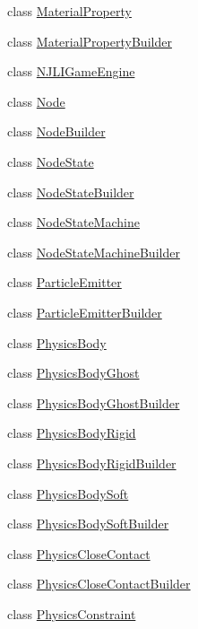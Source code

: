 \begin{DoxyCompactItemize}
class \mbox{\hyperlink{classnjli_1_1_material_property}{Material\+Property}}
\item 
class \mbox{\hyperlink{classnjli_1_1_material_property_builder}{Material\+Property\+Builder}}
\item 
class \mbox{\hyperlink{classnjli_1_1_n_j_l_i_game_engine}{N\+J\+L\+I\+Game\+Engine}}
\item 
class \mbox{\hyperlink{classnjli_1_1_node}{Node}}
\item 
class \mbox{\hyperlink{classnjli_1_1_node_builder}{Node\+Builder}}
\item 
class \mbox{\hyperlink{classnjli_1_1_node_state}{Node\+State}}
\item 
class \mbox{\hyperlink{classnjli_1_1_node_state_builder}{Node\+State\+Builder}}
\item 
class \mbox{\hyperlink{classnjli_1_1_node_state_machine}{Node\+State\+Machine}}
\item 
class \mbox{\hyperlink{classnjli_1_1_node_state_machine_builder}{Node\+State\+Machine\+Builder}}
\item 
class \mbox{\hyperlink{classnjli_1_1_particle_emitter}{Particle\+Emitter}}
\item 
class \mbox{\hyperlink{classnjli_1_1_particle_emitter_builder}{Particle\+Emitter\+Builder}}
\item 
class \mbox{\hyperlink{classnjli_1_1_physics_body}{Physics\+Body}}
\item 
class \mbox{\hyperlink{classnjli_1_1_physics_body_ghost}{Physics\+Body\+Ghost}}
\item 
class \mbox{\hyperlink{classnjli_1_1_physics_body_ghost_builder}{Physics\+Body\+Ghost\+Builder}}
\item 
class \mbox{\hyperlink{classnjli_1_1_physics_body_rigid}{Physics\+Body\+Rigid}}
\item 
class \mbox{\hyperlink{classnjli_1_1_physics_body_rigid_builder}{Physics\+Body\+Rigid\+Builder}}
\item 
class \mbox{\hyperlink{classnjli_1_1_physics_body_soft}{Physics\+Body\+Soft}}
\item 
class \mbox{\hyperlink{classnjli_1_1_physics_body_soft_builder}{Physics\+Body\+Soft\+Builder}}
\item 
class \mbox{\hyperlink{classnjli_1_1_physics_close_contact}{Physics\+Close\+Contact}}
\item 
class \mbox{\hyperlink{classnjli_1_1_physics_close_contact_builder}{Physics\+Close\+Contact\+Builder}}
\item 
class \mbox{\hyperlink{classnjli_1_1_physics_constraint}{Physics\+Constraint}}

\end{DoxyCompactItemize}
